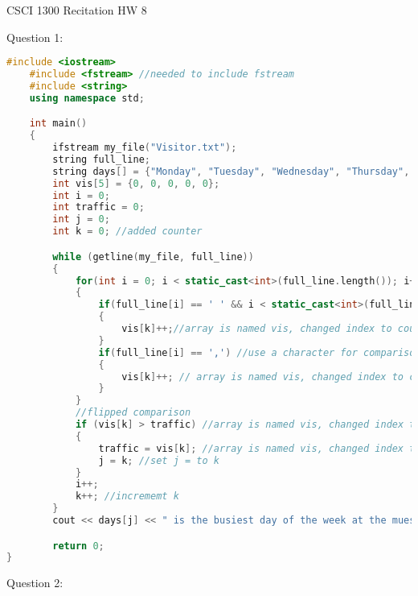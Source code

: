 \documentclass{article}
\begin{document}
CSCI 1300 Recitation HW 8

\vspace{1cm}

Question 1:

\begin{lstlisting}[language=C++]
    #include <iostream>
    #include <fstream> //needed to include fstream
    #include <string>
    using namespace std;

    int main()
    {
        ifstream my_file("Visitor.txt"); 
        string full_line;
        string days[] = {"Monday", "Tuesday", "Wednesday", "Thursday", "Friday"};
        int vis[5] = {0, 0, 0, 0, 0}; 
        int i = 0;
        int traffic = 0;
        int j = 0;
        int k = 0; //added counter

        while (getline(my_file, full_line))
        {
            for(int i = 0; i < static_cast<int>(full_line.length()); i+=1) 
            {
                if(full_line[i] == ' ' && i < static_cast<int>(full_line.length())-1)
                {
                    vis[k]++;//array is named vis, changed index to counter k
                }
                if(full_line[i] == ',') //use a character for comparison
                {
                    vis[k]++; // array is named vis, changed index to counter k
                }
            }
            //flipped comparison
            if (vis[k] > traffic) //array is named vis, changed index to counter k
            {
                traffic = vis[k]; //array is named vis, changed index to counter k
                j = k; //set j = to k
            }
            i++;
            k++; //incrememt k
        }
        cout << days[j] << " is the busiest day of the week at the mueseum." << endl;

        return 0;
}
\end{lstlisting}    

\vspace{1cm}

Question 2:
\end{document}
